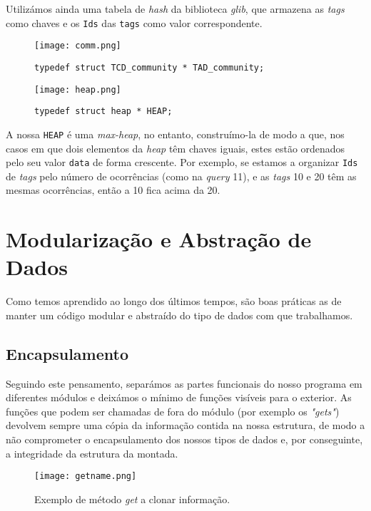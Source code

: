 \documentclass[10pt]{article}
\begin{document}
		Utilizámos ainda uma tabela de \textit{hash} da biblioteca \textit{glib},
	que armazena as \textit{tags} como chaves e os \texttt{Ids} das \texttt{tags}
	como valor correspondente.
	
\begin{figure}[h]
	\begin{minipage}{.5\textwidth}\centering
		\texttt{[image: comm.png]}
		\caption{\texttt{typedef struct TCD\_community * TAD\_community;}}
		\label{fig7:community}
	\end{minipage}
	\begin{minipage}{.5\textwidth}\centering
		\texttt{[image: heap.png]}
		\caption{\texttt{typedef struct heap * HEAP;}}
		\label{fig8:heap}
	\end{minipage}
	
\end{figure}	
	
	A nossa \texttt{HEAP} é uma \textit{max-heap}, no entanto, construímo-la
de modo a que, nos casos em que dois elementos da \textit{heap} têm chaves iguais,
estes estão ordenados pelo seu valor \texttt{data} de forma crescente. Por
exemplo, se estamos a organizar \texttt{Ids} de \textit{tags} pelo número de
ocorrências (como na \textit{query} 11), e as \textit{tags} 10 e 20 têm as mesmas 
ocorrências, então a 10 fica acima da 20.
	
\pagebreak

\section{Modularização e Abstração de Dados}
		Como temos aprendido ao longo dos últimos tempos, são boas práticas as de 
	manter um código modular e abstraído do tipo de dados com que	trabalhamos.
	
	\subsection*{Encapsulamento}
	
		Seguindo este pensamento, separámos as partes funcionais do nosso programa
	em diferentes módulos e deixámos o mínimo de funções visíveis para o exterior. As
	funções que podem ser chamadas de fora do módulo (por exemplo os \textit{"gets"})
	devolvem sempre uma cópia da informação contida na nossa estrutura, de modo a não
	comprometer o encapsulamento dos nossos tipos de dados e, por conseguinte, a integridade
	da estrutura da montada.
	
	
\begin{figure}[h]
\centering
		\begin{minipage}{.5\textwidth}\centering
		\texttt{[image: getname.png]}
		\caption{Exemplo de método \textit{get} a clonar informação.}
		\label{fig9:getname}
	\end{minipage}
\end{figure}
	
\end{document}
